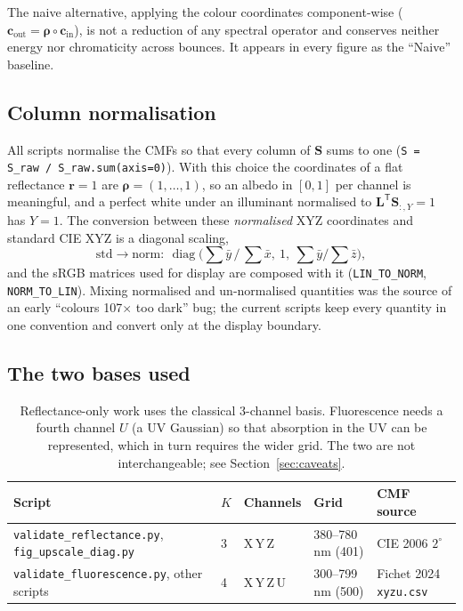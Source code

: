 \documentclass[11pt,a4paper]{article}
\newcommand{\mS}{\mathbf{S}}
\newcommand{\vr}{\mathbf{r}}
\newcommand{\vrho}{\boldsymbol{\rho}}
\newcommand{\vc}{\mathbf{c}}
\newcommand{\vL}{\mathbf{L}}
\newcommand{\diag}{\operatorname{diag}}
\newcommand{\transp}{^{\mathsf{T}}}
\newcommand{\file}[1]{\texttt{#1}}
\newcommand{\code}[1]{\texttt{#1}}
\begin{document}
The naive alternative, applying the colour coordinates component-wise
($\vc_{\text{out}} = \vrho\circ\vc_{\text{in}}$), is not a reduction of any
spectral operator and conserves neither energy nor chromaticity across
bounces.  It appears in every figure as the ``Naive'' baseline.

\subsection{Column normalisation}

All scripts normalise the CMFs so that every column of $\mS$ sums to one
(\code{S = S\_raw / S\_raw.sum(axis=0)}).  With this choice the coordinates of a
flat reflectance $\vr = 1$ are $\vrho = (1,\dots,1)$, so an albedo in
$[0,1]$ per channel is meaningful, and a perfect white under an illuminant
normalised to $\vL\transp\mS_{:,Y} = 1$ has $Y=1$.  The conversion between
these \emph{normalised} XYZ coordinates and standard CIE XYZ is a diagonal
scaling,
\begin{equation}
  \mathrm{std}\to\mathrm{norm}:\ \diag\!\big(\textstyle\sum\bar y\,/\,\sum\bar x,\ 1,\ \sum\bar y/\sum\bar z\big),
\end{equation}
and the sRGB matrices used for display are composed with it
(\code{LIN\_TO\_NORM}, \code{NORM\_TO\_LIN}).  Mixing normalised and
un-normalised quantities was the source of an early ``colours 107$\times$ too
dark'' bug; the current scripts keep every quantity in one convention and
convert only at the display boundary.

\subsection{The two bases used}

\begin{table}[h]\centering\small
\begin{tabular}{@{}lllll@{}}
\toprule
Script & $K$ & Channels & Grid & CMF source \\
\midrule
\file{validate\_reflectance.py}, \file{fig\_upscale\_diag.py} & 3 & X\,Y\,Z & 380--780\,nm (401) & CIE 2006 $2^\circ$ \\
\file{validate\_fluorescence.py}, other scripts & 4 & X\,Y\,Z\,U & 300--799\,nm (500) & Fichet 2024 \file{xyzu.csv} \\
\bottomrule
\end{tabular}
\caption{Reflectance-only work uses the classical 3-channel basis.  Fluorescence
needs a fourth channel $U$ (a UV Gaussian) so that absorption in the UV can be
represented, which in turn requires the wider grid.  The two are not
interchangeable; see Section~\ref{sec:caveats}.}
\label{tab:bases}
\end{table}
\end{document}
